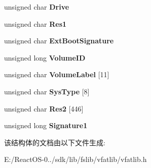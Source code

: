 \begin{DoxyCompactItemize}
unsigned char {\bfseries Drive}
\item 
\mbox{\label{struct___f_a_t16___b_o_o_t___s_e_c_t_o_r_aec9dd4e4c206bae89c0ebc2004606e9a}} 
unsigned char {\bfseries Res1}
\item 
\mbox{\label{struct___f_a_t16___b_o_o_t___s_e_c_t_o_r_a0e9397d5bb14a6ecbbac7b966229a258}} 
unsigned char {\bfseries Ext\+Boot\+Signature}
\item 
\mbox{\label{struct___f_a_t16___b_o_o_t___s_e_c_t_o_r_a77f6d2592e56edae0e79f553f4e472e0}} 
unsigned long {\bfseries Volume\+ID}
\item 
\mbox{\label{struct___f_a_t16___b_o_o_t___s_e_c_t_o_r_a346a3c4f1c6fc18720548682a2fed4b8}} 
unsigned char {\bfseries Volume\+Label} \mbox{[}11\mbox{]}
\item 
\mbox{\label{struct___f_a_t16___b_o_o_t___s_e_c_t_o_r_a0a57db4e236fc67922a82225ed0d4010}} 
unsigned char {\bfseries Sys\+Type} \mbox{[}8\mbox{]}
\item 
\mbox{\label{struct___f_a_t16___b_o_o_t___s_e_c_t_o_r_a7c8a17963fb3919c93c27ee81645ffab}} 
unsigned char {\bfseries Res2} \mbox{[}446\mbox{]}
\item 
\mbox{\label{struct___f_a_t16___b_o_o_t___s_e_c_t_o_r_af3f0e94b720674b47d94e16547790715}} 
unsigned long {\bfseries Signature1}
\end{DoxyCompactItemize}


该结构体的文档由以下文件生成\+:\begin{DoxyCompactItemize}
\item 
E\+:/\+React\+O\+S-\/0../sdk/lib/fslib/vfatlib/vfatlib.\+h\end{DoxyCompactItemize}
